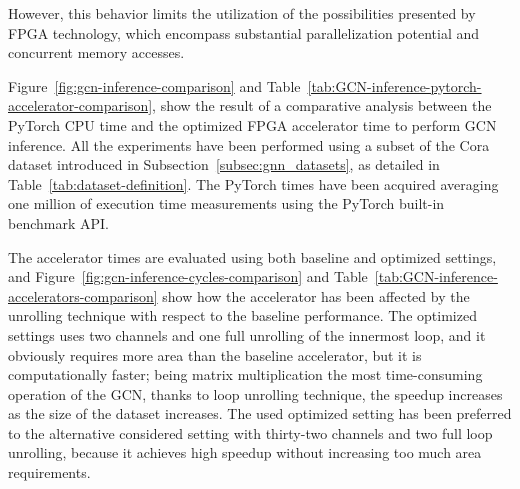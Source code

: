 However, this behavior limits the utilization of the possibilities presented by FPGA technology, which encompass substantial parallelization potential and concurrent memory accesses.

Figure~\ref{fig:gcn-inference-comparison} and Table~\ref{tab:GCN-inference-pytorch-accelerator-comparison}, show the result of a comparative analysis between the PyTorch CPU time and the optimized FPGA accelerator time to perform GCN inference.
All the experiments have been performed using a subset of the Cora dataset introduced in Subsection~\ref{subsec:gnn_datasets}, as detailed in Table~\ref{tab:dataset-definition}.
The PyTorch times have been acquired averaging one million of execution time measurements using the PyTorch built-in benchmark API\@.

The accelerator times are evaluated using both baseline and optimized settings, and Figure~\ref{fig:gcn-inference-cycles-comparison} and Table~\ref{tab:GCN-inference-accelerators-comparison} show how the accelerator has been affected by the unrolling technique with respect to the baseline performance.
The optimized settings uses two channels and one full unrolling of the innermost loop, and it obviously requires more area than the baseline accelerator, but it is computationally faster; being matrix multiplication the most time-consuming operation of the GCN, thanks to loop unrolling technique, the speedup increases as the size of the dataset increases.
The used optimized setting has been preferred to the alternative considered setting with thirty-two channels and two full loop unrolling, because it achieves high speedup without increasing too much area requirements.

